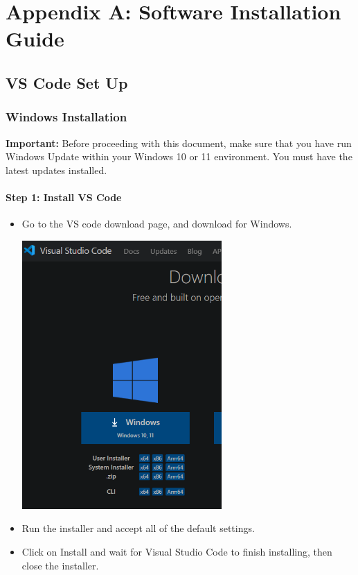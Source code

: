 \chapter*{Appendix A: Software Installation Guide}
\setcounter{chapter}{16}
\setcounter{section}{0}

\section{VS Code Set Up}

\subsection{Windows Installation}
\textbf{Important:} Before proceeding with this document, make sure that you have run Windows Update within your Windows 10 or 11 environment. You must have the latest updates installed. 
\subsubsection{Step 1: Install VS Code}
\begin{itemize}
    \item Go to the VS code download page, and download for Windows.
    
    \includegraphics[width=3in]{images/windowsVSCodeSetup/image6.png}
    
    \item Run the installer and accept all of the default settings.
    \item Click on Install and wait for Visual Studio Code to finish installing, then close the installer.
\end{itemize}
